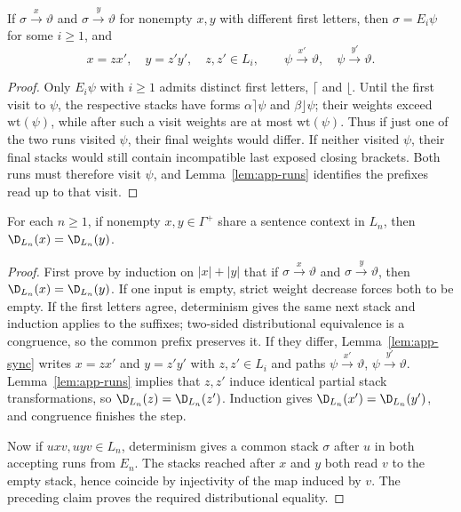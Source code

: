 \begin{lemma}
\label{lem:app-sync}
If $\sigma\xrightarrow{x}\vartheta$ and
$\sigma\xrightarrow{y}\vartheta$ for nonempty
$x,y$ with different first letters, then
$\sigma=E_i\psi$ for some $i\ge1$, and
\[
 x=zx',\quad y=z'y',\quad z,z'\in L_i,
 \qquad
 \psi\xrightarrow{x'}\vartheta,\quad
 \psi\xrightarrow{y'}\vartheta.
\]
\end{lemma}

\begin{proof}
Only $E_i\psi$ with $i\ge1$ admits distinct
first letters, $\lceil$ and $\lfloor$.
Until the first visit to $\psi$, the
respective stacks have forms
$\alpha\rceil\psi$ and $\beta\rfloor\psi$;
their weights exceed $\mathrm{wt}(\psi)$,
while after such a visit weights are at most
$\mathrm{wt}(\psi)$.
Thus if just one of the two runs visited
$\psi$, their final weights would differ.
If neither visited $\psi$, their final
stacks would still contain incompatible
last exposed closing brackets.
Both runs must therefore visit $\psi$,
and Lemma~\ref{lem:app-runs} identifies the
prefixes read up to that visit.
\end{proof}

\begin{proposition}
\label{prop:app-bracketed-substitutable}
For each $n\ge1$, if nonempty
$x,y\in\Gamma^+$ share a sentence context
in $L_n$, then
$\D_{L_n}(x)=\D_{L_n}(y)$.
\end{proposition}

\begin{proof}
First prove by induction on $|x|+|y|$
that if $\sigma\xrightarrow{x}\vartheta$
and $\sigma\xrightarrow{y}\vartheta$,
then $\D_{L_n}(x)=\D_{L_n}(y)$.
If one input is empty, strict weight decrease
forces both to be empty. If the first letters
agree, determinism gives the same next stack
and induction applies to the suffixes;
two-sided distributional equivalence is a
congruence, so the common prefix preserves it.
If they differ, Lemma~\ref{lem:app-sync}
writes $x=zx'$ and $y=z'y'$ with
$z,z'\in L_i$ and paths
$\psi\xrightarrow{x'}\vartheta$,
$\psi\xrightarrow{y'}\vartheta$.
Lemma~\ref{lem:app-runs} implies that
$z,z'$ induce identical partial stack
transformations, so
$\D_{L_n}(z)=\D_{L_n}(z')$.
Induction gives
$\D_{L_n}(x')=\D_{L_n}(y')$,
and congruence finishes the step.

Now if $uxv,uyv\in L_n$, determinism
gives a common stack $\sigma$ after $u$
in both accepting runs from $E_n$.
The stacks reached after $x$ and $y$
both read $v$ to the empty stack, hence
coincide by injectivity of the map induced by
$v$. The preceding claim proves the required
distributional equality.
\end{proof}
